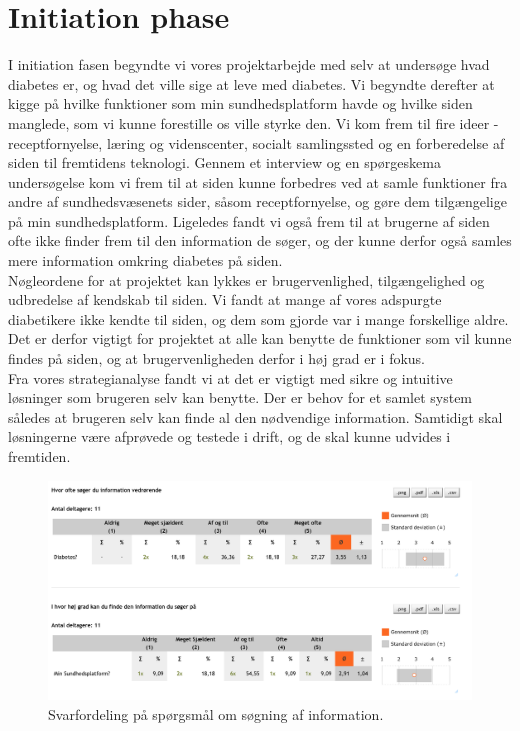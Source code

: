 \section{Initiation phase}
I initiation fasen begyndte vi vores projektarbejde med selv at undersøge hvad diabetes er, og hvad det ville sige at leve med diabetes. Vi begyndte derefter at kigge på hvilke funktioner som min sundhedsplatform havde og hvilke siden manglede, som vi kunne forestille os ville styrke den. Vi kom frem til fire ideer - receptfornyelse, læring og videnscenter, socialt samlingssted og en forberedelse af siden til fremtidens teknologi. Gennem et interview og en spørgeskema undersøgelse kom vi frem til at siden kunne forbedres ved at samle funktioner fra andre af sundhedsvæsenets sider, såsom receptfornyelse, og gøre dem tilgængelige på min sundhedsplatform. Ligeledes fandt vi også frem til at brugerne af siden ofte ikke finder frem til den information de søger, og der kunne derfor også samles mere information omkring diabetes på siden.\\
Nøgleordene for at projektet kan lykkes er brugervenlighed, tilgængelighed og udbredelse af kendskab til siden. Vi fandt at mange af vores adspurgte diabetikere ikke kendte til siden, og dem som gjorde var i mange forskellige aldre. Det er derfor vigtigt for projektet at alle kan benytte de funktioner som vil kunne findes på siden, og at brugervenligheden derfor i høj grad er i fokus.\\
Fra vores strategianalyse fandt vi at det er vigtigt med sikre og intuitive løsninger som brugeren selv kan benytte. Der er behov for et samlet system således at brugeren selv kan finde al den nødvendige information. Samtidigt skal løsningerne være afprøvede og testede i drift, og de skal kunne udvides i fremtiden.
\begin{figure}[H]
	\centering
	\includegraphics[width=\textwidth]{Materials/SeekingInformation}
	\caption{Svarfordeling på spørgsmål om søgning af information.}
\end{figure}
